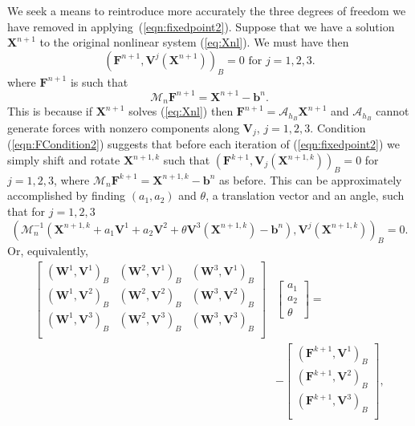 \documentclass[preprint,12pt]{elsarticle}
\begin{document}
We seek a means to reintroduce more accurately the three degrees of freedom we have removed in applying~(\ref{eqn:fixedpoint2}).
Suppose that we have a solution $\mathbf{X}^{n+1}$ to the original nonlinear system (\ref{eq:Xnl}). We must have then
\begin{equation}
( \mathbf{F}^{n+1}, \mathbf{V}^j(\mathbf{X}^{n+1}) )_B = 0
\textrm{ for } j=1,2,3.
\label{eqn:FCondition2}
\end{equation}
where $\mathbf{F}^{n+1}$ is such that 
\begin{equation}
\mathcal{M}_n\mathbf{F}^{n+1}=\mathbf{X}^{n+1}-\mathbf{b}^n.
\end{equation}
This is because if $\mathbf{X}^{n+1}$ solves (\ref{eq:Xnl}) then $\mathbf{F}^{n+1} = \mathcal{A}_{h_B}\mathbf{X}^{n+1}$ and $\mathcal{A}_{h_B}$ cannot generate forces with nonzero components along $\mathbf{V}_j$, $j=1,2,3$.
Condition (\ref{eqn:FCondition2}) suggests that before each iteration of (\ref{eqn:fixedpoint2}) we simply shift and rotate $\mathbf{X}^{n+1,k}$ such that 
$( \mathbf{F}^{k+1}, \mathbf{V}_j(\mathbf{X}^{n+1,k}) )_B = 0$ for $j=1,2,3$, where $\mathcal{M}_n\mathbf{F}^{k+1}=\mathbf{X}^{n+1,k}-\mathbf{b}^n$ as before. This can be approximately accomplished by finding $(a_1,a_2)$ and $\theta$, a translation vector and an angle, such that for $j=1,2,3$
\begin{equation}
( \mathcal{M}_n^{-1}(\mathbf{X}^{n+1,k}+a_1\mathbf{V}^1+a_2\mathbf{V}^2+\theta\mathbf{V}^3(\mathbf{X}^{n+1,k})-\mathbf{b}^n),  \mathbf{V}^j(\mathbf{X}^{n+1,k}) )_B = 0.
\label{eqn:ProjFree}
\end{equation}
Or, equivalently,
\begin{equation}
\begin{split}
\left[ \begin{array}{ccc}
(\mathbf{W}^1,\mathbf{V}^1)_B &
(\mathbf{W}^2,\mathbf{V}^1)_B &
(\mathbf{W}^3,\mathbf{V}^1)_B \\
(\mathbf{W}^1,\mathbf{V}^2)_B &
(\mathbf{W}^2,\mathbf{V}^2)_B &
(\mathbf{W}^3,\mathbf{V}^2)_B \\
(\mathbf{W}^1,\mathbf{V}^3)_B &
(\mathbf{W}^2,\mathbf{V}^3)_B &
(\mathbf{W}^3,\mathbf{V}^3)_B \\ 
\end{array} \right] &
\left[ \begin{array}{c}
a_1 \\ a_2 \\ \theta
\end{array} \right]
= \\
&-\left[ \begin{array}{c}
(\mathbf{F}^{k+1},\mathbf{V}^1)_B \\
(\mathbf{F}^{k+1},\mathbf{V}^2)_B \\
(\mathbf{F}^{k+1},\mathbf{V}^3)_B \\
\end{array} \right],
\end{split}
\end{equation}
\end{document}
